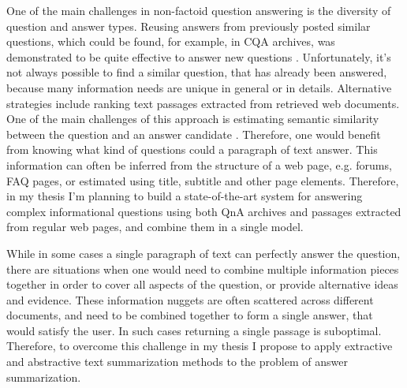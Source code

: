 One of the main challenges in non-factoid question answering is the diversity of question and answer types.
Reusing answers from previously posted similar questions, which could be found, for example, in CQA archives, was demonstrated to be quite effective to answer new questions \cite{carmel2000eresponder,Shtok:2012:LPA:2187836.2187939}.
Unfortunately, it's not always possible to find a similar question, that has already been answered, because many information needs are unique in general or in details.
Alternative strategies include ranking text passages extracted from retrieved web documents.
One of the main challenges of this approach is estimating semantic similarity between the question and an answer candidate \cite{soricut2006automatic}.
Therefore, one would benefit from knowing what kind of questions could a paragraph of text answer.
This information can often be inferred from the structure of a web page, e.g. forums, FAQ pages, or estimated using title, subtitle and other page elements.
Therefore, in my thesis I'm planning to build a state-of-the-art system for answering complex informational questions using both QnA archives and passages extracted from regular web pages, and combine them in a single model.

While in some cases a single paragraph of text can perfectly answer the question, there are situations when one would need to combine multiple information pieces together in order to cover all aspects of the question, or provide alternative ideas and evidence.
These information nuggets are often scattered across different documents, and need to be combined together to form a single answer, that would satisfy the user.
In such cases returning a single passage is suboptimal.
Therefore, to overcome this challenge in my thesis I propose to apply extractive and abstractive text summarization methods to the problem of answer summarization.


